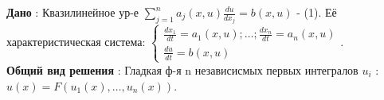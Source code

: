 \documentclass[unicode, 8pt, a4paper,oneside, landscape]{article}
\begin{document}
\begin{multicols}{4}
{\bf Дано} : Квазилинейное ур-е $\sum_{j=1}^n a_j(x, u) \frac{du}{dx_j} = b(x,u)$ - (1). Её характеристическая система: $\begin{cases} \frac{dx_1}{dt} = a_1(x,u); \ldots; \frac{dx_n}{dt} = a_n(x,u) \\ \frac{du}{dt} = b(x, u) \end{cases}$.\\
{\bf Общий вид решения} : Гладкая ф-я n независисмых первых интегралов $u_i$ : $u(x) = F(u_1(x), \ldots, u_{n}(x))$.
 
































   






\end{multicols}	
\end{document}
